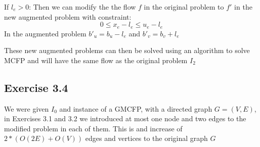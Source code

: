 If \(l_e>0\): Then we can modify the the flow \(f\) in the original problem to \(f'\) in the new augmented problem with constraint: \[ 0 \le x_e - l_e \le u_e - l_e\]
In the augmented problem \(b'_u = b_u - l_e\) and \(b'_v = b_v + l_e\)

These new augmented problems can then be solved using an algorithm to solve MCFP and will have the same flow as the original problem \(I_2\)


\subsection{Exercise 3.4}
We were given \(I_0\) and instance of a GMCFP, with a directed graph \(G =(V,E)\), in Exercises 3.1 and 3.2 we introduced at most one node and two edges to the modified problem in each of them. This is and increase of \(2*(O(2E)+O(V))\) edges and vertices to the original graph \(G\)
